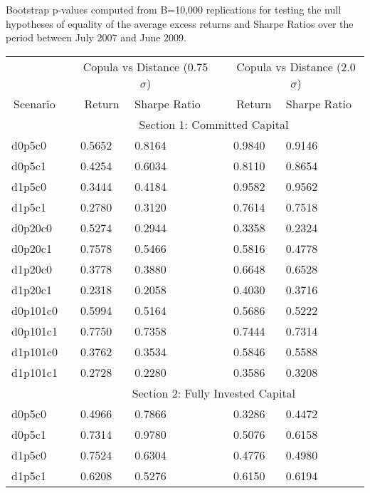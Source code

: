 \documentclass[a4paper]{article}
\begin{document}
	\begin{threeparttable}[H]
		\centering \scriptsize
		\caption{Bootstrap p-values computed from B=10,000 replications for testing the null hypotheses of equality of the average excess returns and Sharpe Ratios over the period between July 2007 and June 2009.}
		\begin{tabularx}{\textwidth}{@{\extracolsep{\fill}}lllllll@{}}
			\toprule
			& & \multicolumn{2}{c}{Copula vs Distance (0.75$\sigma$)} & \multicolumn{1}{c}{} & \multicolumn{2}{c}{Copula vs Distance (2.0$\sigma$)} \\
			\cmidrule{3-4}  \cmidrule{6-7}
			\multicolumn{1}{c}{Scenario} & & \multicolumn{1}{c}{Return} & Sharpe Ratio &       & \multicolumn{1}{c}{Return}& Sharpe Ratio \\
			\midrule
			& \multicolumn{6}{c}{Section 1: Committed Capital} \\
			\midrule
			d0p5c0 & & 0.5652 & 0.8164 &       & 0.9840 & 0.9146 \\
			d0p5c1 & & 0.4254 & 0.6034 &       & 0.8110 & 0.8654 \\
			d1p5c0 & & 0.3444 & 0.4184 &       & 0.9582 & 0.9562 \\
			d1p5c1 & & 0.2780 & 0.3120 &       & 0.7614 & 0.7518 \\
			d0p20c0 & & 0.5274 & 0.2944 &       & 0.3358 & 0.2324 \\
			d0p20c1 & & 0.7578 & 0.5466 &       & 0.5816 & 0.4778 \\
			d1p20c0 & & 0.3778 & 0.3880 &       & 0.6648 & 0.6528 \\
			d1p20c1 & & 0.2318 & 0.2058 &       & 0.4030 & 0.3716 \\
			d0p101c0 & & 0.5994 & 0.5164 &       & 0.5686 & 0.5222 \\
			d0p101c1 & & 0.7750 & 0.7358 &       & 0.7444 & 0.7314 \\
			d1p101c0 & & 0.3762 & 0.3534 &       & 0.5846 & 0.5588 \\
			d1p101c1 & & 0.2728 & 0.2280 &       & 0.3586 & 0.3208 \\
			\midrule
			& \multicolumn{6}{c}{Section 2:  Fully Invested Capital } \\
			\midrule
			d0p5c0 & & 0.4966 & 0.7866 &       & 0.3286 & 0.4472 \\
			d0p5c1 & & 0.7314 & 0.9780 &       & 0.5076 & 0.6158 \\
			d1p5c0 & & 0.7524 & 0.6304 &       & 0.4776 & 0.4980 \\
			d1p5c1 & & 0.6208 & 0.5276 &       & 0.6150 & 0.6194 \\

\end{tabularx}
\end{threeparttable}
\end{document}
